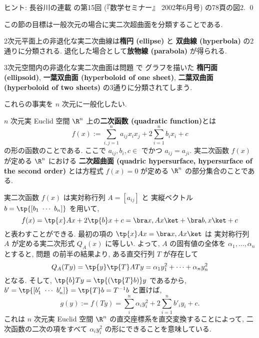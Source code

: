 \documentclass[12pt,twoside]{jarticle}
\begin{document}
\noindent
ヒント: 長谷川の連載 \cite{hasegawa-rensai} の第15回 
(『数学セミナー』 2002年6月号) の78頁の図2.
\qed

\bigskip

この節の目標は一般次元の場合に実二次超曲面を分類することである.

2次元平面上の非退化な実二次曲線は{\bf 楕円 (ellipse)} と
{\bf 双曲線 (hyperbola)} の2通りに分類される.
退化した場合として{\bf 放物線 (parabola)} が得られる.

3次元空間内の非退化な実二次曲面は問題  で
グラフを描いた
{\bf 楕円面 (ellipsoid)}, 
{\bf 一葉双曲面 (hyperboloid of one sheet)}, 
{\bf 二葉双曲面 (hyperboloid of two sheets)}
の3通りに分類されてしまう.

これらの事実を $n$ 次元に一般化したい.

\medskip

$n$ 次元実 Euclid 空間 $\R^n$ 上の{\bf 二次函数 (quadratic function)}とは
\begin{equation*}
  f(x) := \sum_{i,j=1}^n a_{ij}x_ix_j + 2\sum_{i=1}^n b_ix_i + c
\end{equation*}
の形の函数のことである. ここで $a_{ij},b_i,c\in$ でかつ $a_{ij}=a_{ji}$.
実二次函数 $f(x)$ が定める $\R^n$ における
{\bf 二次超曲面 (quadric hypersurface, hypersurface of the second order)} 
とは方程式 $f(x)=0$ が定める $\R^n$ の部分集合のことである.

実二次函数 $f(x)$ は実対称行列 $A=[a_{ij}]$ と
実縦ベクトル $b=\tp{[b_1\ \cdots\ b_n]}$ を用いて,
\begin{equation*}
  f(x) = \tp{x}Ax + 2\tp{b}x + c = \bra x,Ax\ket + \bra b,x\ket + c
\end{equation*}
と表わすことができる.  最初の項の $\tp{x}Ax=\bra x,Ax\ket$ は
実対称行列 $A$ が定める実二次形式 $Q_A(x)$ に等しい.
よって, $A$ の固有値の全体を $\alpha_1,\dots,\alpha_n$ とすると, 
問題  の前半の結果より, 
ある直交行列 $T$ が存在して
\begin{equation*}
  Q_A(Ty) = \tp{y}\tp{T}ATy = \alpha_1 y_1^2 + \cdots + \alpha_n y_n^2
\end{equation*}
となる. そして, $\tp{b}Ty=\tp{(\tp{T}b)}y$ であるから,
$b'=\tp{[b'_1\ \cdots\ b'_n]}=\tp{T}b=T^{-1}b$ と置けば,
\begin{equation*}
  g(y) := f(Ty) 
  = \sum_{i}^n \alpha_i y_i^2 + 2\sum_{i=1}^n b'_i y_i + c.
\tag{0}
\end{equation*}
これは $n$ 次元実 Euclid 空間 $\R^n$ の直交座標系を直交変換することによって,
二次函数の二次の項をすべて $\alpha_i y_i^2$ の形にできることを意味している.
\end{document}
